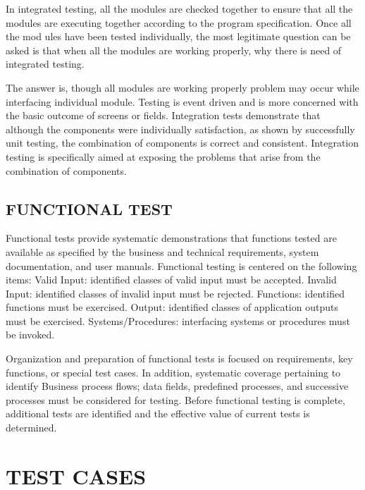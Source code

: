\documentclass[12pt]{report}
\begin{document}
In integrated testing, all the modules are checked together to ensure that all the modules are 
executing together according to the program specification. Once all the mod ules have been 
tested individually, the most legitimate question can be asked is that when all the modules 
are working properly, why there is need of integrated testing.

The answer is, though all modules are working properly problem may occur while interfacing 
individual module. Testing is event driven and is more concerned with the 
basic outcome of screens or fields. Integration tests demonstrate that although the components 
were individually satisfaction, as shown by successfully unit testing, the combination of 
components is correct and consistent. Integration testing is specifically aimed at exposing the 
problems that arise from the combination of components.

\subsection{FUNCTIONAL TEST}
\justifying
\setlength{\parindent}{4em}
\setlength{\parskip}{0.5em}
\renewcommand{\baselinestretch}{1.5}
\normalsize

Functional tests provide systematic demonstrations that functions tested are available as 
specified by the business and technical requirements, system documentation, and user 
manuals. Functional testing is centered on the following items: Valid Input: identified classes 
of valid input must be accepted. Invalid Input: identified classes of invalid input must be 
rejected. Functions: identified functions must be exercised. Output: identified classes of 
application outputs must be exercised. Systems/Procedures: interfacing systems or procedures 
must be invoked.

Organization and preparation of functional tests is focused on requirements, key functions, or 
special test cases. In addition, systematic coverage pertaining to identify Business process 
flows; data fields, predefined processes, and successive processes must be considered for 
testing. Before functional testing is complete, additional tests are identified and the effective 
value of current tests is determined.




\clearpage


\centering

\section{TEST CASES}
\end{document}
